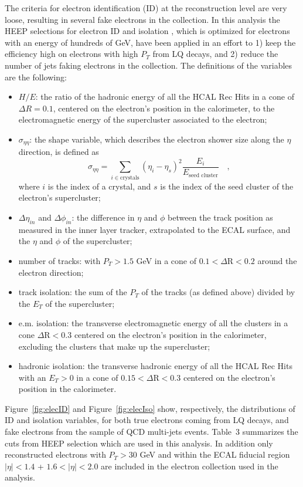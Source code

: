 \documentclass[colclass=cmspaper]{combine}
\begin{document}
\begin{linenumbers}
The criteria for electron identification (ID) at the reconstruction level are very loose, resulting in several fake electrons 
in the collection. In this analysis the HEEP selections for electron ID and isolation \cite{EleID}, which is optimized for 
electrons with an energy of hundreds of GeV, have been applied in an effort to 1) keep the efficiency high on electrons with high $P_{T}$ from LQ decays, and 
2) reduce the number of jets faking electrons in the collection.
The definitions of the variables are the following:
%
\begin{itemize}
%
\item $H/E$: the ratio of the hadronic energy of all the HCAL Rec Hits in a cone of $\Delta R=0.1$, centered on the 
electron's position in the calorimeter, to the electromagnetic energy of the supercluster associated to the electron;
%
\item $\sigma_{\eta\eta}$: the shape variable, which describes the electron shower size along the $\eta$ direction, is 
defined as 
\begin{displaymath}
\sigma_{\eta\eta} = \sum_{i \in \mathrm{crystals}} ( \eta_i - \eta_s )^2 \frac{E_i}{E_{\mbox{seed cluster}}} \quad ,
\end{displaymath}
where $i$ is the index of a crystal, and $s$ is the index of the seed cluster of the electron's supercluster;
%
\item $\Delta\eta_{in}$ and $\Delta\phi_{in}$: the difference in $\eta$ and $\phi$ between the track position as 
measured in the inner layer tracker, extrapolated to the ECAL surface, and the $\eta$ and $\phi$ of the supercluster;
%
\item number of tracks: with $P_{T}>1.5$ GeV in a cone of $0.1 < \Delta\mbox{R} < 0.2 $ around the electron direction;
%
\item track isolation: the sum of the $P_{T}$ of the tracks (as defined above) divided by the $E_{T}$ of the supercluster;
%
\item e.m. isolation: the transverse electromagnetic energy of all the clusters in a cone $\Delta\mbox{R} < 0.3$ centered on the 
electron's position in the calorimeter, excluding the clusters that make up the supercluster;
%
\item hadronic isolation: the transverse hadronic energy of all the HCAL Rec Hits with an $E_{T}>0$ in a cone of
$0.15 < \Delta\mbox{R} < 0.3$ centered on the electron's position in the calorimeter. 
%
\end{itemize}

Figure~\ref{fig:elecID} and Figure~\ref{fig:elecIso} show, respectively, the distributions of ID and isolation variables, 
for both true electrons coming from LQ decays, and fake electrons from the sample of QCD multi-jets events. 
Table~3
summarizes the cuts from HEEP selection which are 
used in this analysis. In addition only reconstructed electrons with $P_{T}>30$ GeV and 
within the ECAL fiducial region 
$|\eta|<1.4$ + $1.6<|\eta|<2.0$ are included in the electron collection used in the analysis.  


\end{linenumbers}
\end{document}

